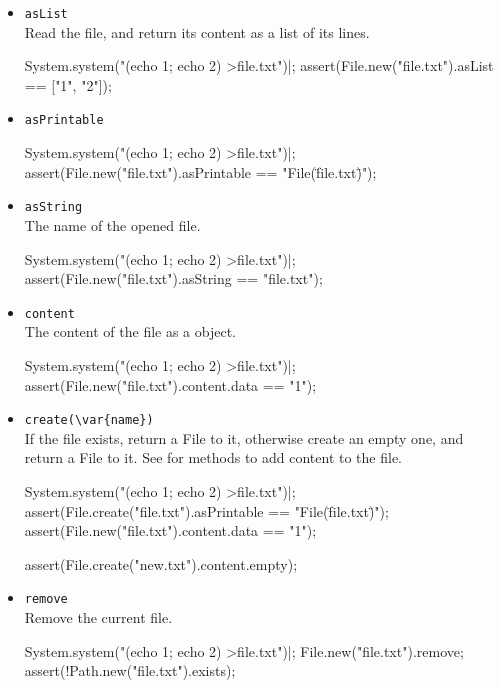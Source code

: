 \begin{itemize}
\item \lstinline|asList|\\
  Read the file, and return its content as a list of its lines.
\begin{urbiscript}[firstnumber=last]
System.system("(echo 1; echo 2) >file.txt")|;
assert(File.new("file.txt").asList == ["1", "2"]);
\end{urbiscript}

\item \lstinline|asPrintable|\\
\begin{urbiscript}[firstnumber=last]
System.system("(echo 1; echo 2) >file.txt")|;
assert(File.new("file.txt").asPrintable == "File(\"file.txt\")");
\end{urbiscript}

\item \lstinline|asString|\\
  The name of the opened file.
\begin{urbiscript}[firstnumber=last]
System.system("(echo 1; echo 2) >file.txt")|;
assert(File.new("file.txt").asString == "file.txt");
\end{urbiscript}

\item \lstinline|content|\\
  The content of the file as a  object.
\begin{urbiscript}[firstnumber=last]
System.system("(echo 1; echo 2) >file.txt")|;
assert(File.new("file.txt").content.data == "1\n");
\end{urbiscript}

\item \lstinline|create(\var{name})|\\
  If the file  exists, return a File to it, otherwise create
  an empty one, and return a File to it.  See 
  for methods to add content to the file.
\begin{urbiscript}[firstnumber=last]
System.system("(echo 1; echo 2) >file.txt")|;
assert(File.create("file.txt").asPrintable == "File(\"file.txt\")");
assert(File.new("file.txt").content.data == "1\n");

assert(File.create("new.txt").content.empty);
\end{urbiscript}

\item \lstinline|remove|\\
  Remove the current file.
\begin{urbiscript}[firstnumber=last]
System.system("(echo 1; echo 2) >file.txt")|;
File.new("file.txt").remove;
assert(!Path.new("file.txt").exists);
\end{urbiscript}


\end{itemize}
